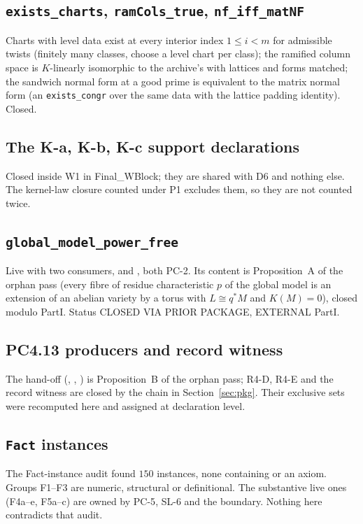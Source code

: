 \documentclass[10pt]{article}
\newcommand{\PC}[1]{\textsf{PC-#1}}
\newcommand{\SL}[1]{\textsf{SL-#1}}
\begin{document}
\subsection{\texttt{exists\_charts}, \texttt{ramCols\_true}, \texttt{nf\_iff\_matNF}}
Charts with level data exist at every interior index $1\le i<m$ for admissible twists (finitely many classes, choose a level chart per class); the ramified column space is $K$-linearly isomorphic to the archive's  with lattices and forms matched; the sandwich normal form at a good prime is equivalent to the matrix normal form (an \texttt{exists\_congr} over the same data with the lattice padding identity). Closed.

\subsection{The K-a, K-b, K-c support declarations}
Closed inside W1 in Final\_WBlock; they are shared with D6 and nothing else. The kernel-law closure counted under P1 excludes them, so they are not counted twice.

\subsection{\texttt{global\_model\_power\_free}}
Live with two consumers,  and , both \PC{2}. Its content is Proposition~A of the orphan pass (every fibre of residue characteristic $p$ of the global model is an extension of an abelian variety by a torus with $L\cong q^*M$ and $K(M)=0$), closed modulo PartI. Status CLOSED VIA PRIOR PACKAGE, EXTERNAL PartI.

\subsection{PC4.13 producers and record witness}
The hand-off (, , ) is Proposition~B of the orphan pass; R4-D, R4-E and the record witness are closed by the chain in Section~\ref{sec:pkg}. Their exclusive sets were recomputed here and assigned at declaration level.

\subsection{\texttt{Fact} instances}
The Fact-instance audit found $150$ instances, none containing  or an axiom. Groups F1--F3 are numeric, structural or definitional. The substantive live ones (F4a--e, F5a--c) are owned by \PC{5}, \SL{6} and the boundary. Nothing here contradicts that audit.
\end{document}
